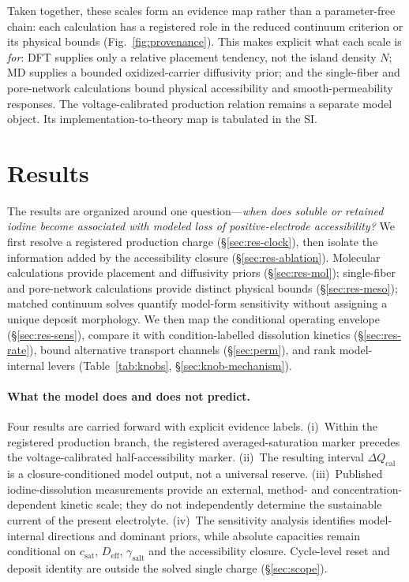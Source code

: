 \documentclass[11pt]{article}
\newcommand{\csat}{c_{\mathrm{sat}}}
\newcommand{\Deff}{D_{\mathrm{eff}}}
\begin{document}
Taken together, these scales form an evidence map rather than a parameter-free chain: each calculation has a
registered role in the reduced continuum criterion or its physical bounds (Fig.~\ref{fig:provenance}). This
makes explicit what each scale is \emph{for}: DFT supplies only a relative placement tendency, not the island
density $N$; MD supplies a bounded oxidized-carrier diffusivity prior; and the single-fiber and pore-network
calculations bound physical accessibility and smooth-permeability responses. The voltage-calibrated
production relation remains a separate model object. Its implementation-to-theory map is tabulated in the SI.

\section{Results}
\label{sec:results}
The results are organized around one question---\emph{when does soluble or retained iodine become associated
with modeled loss of positive-electrode accessibility?} We first resolve a registered production charge
(\S\ref{sec:res-clock}), then isolate the information added by the accessibility closure
(\S\ref{sec:res-ablation}). Molecular calculations provide placement and diffusivity priors
(\S\ref{sec:res-mol}); single-fiber and pore-network calculations provide distinct physical bounds
(\S\ref{sec:res-meso}); matched continuum solves quantify model-form sensitivity without assigning a unique
deposit morphology. We then map the conditional operating envelope (\S\ref{sec:res-sens}), compare it with
condition-labelled dissolution kinetics (\S\ref{sec:res-rate}), bound alternative transport channels
(\S\ref{sec:perm}), and rank model-internal levers (Table~\ref{tab:knobs},
\S\ref{sec:knob-mechanism}).

\paragraph{What the model does and does not predict.}
Four results are carried forward with explicit evidence labels. (i)~Within the registered production branch,
the registered averaged-saturation marker precedes the voltage-calibrated half-accessibility marker. (ii)~The resulting interval
$\Delta Q_{\mathrm{cal}}$ is a closure-conditioned model output, not a universal reserve. (iii)~Published
iodine-dissolution measurements provide an external, method- and concentration-dependent kinetic scale; they
do not independently determine the sustainable current of the present electrolyte. (iv)~The sensitivity
analysis identifies model-internal directions and dominant priors, while absolute capacities remain conditional
on $\csat$, $\Deff$, $\gamma_{\mathrm{salt}}$ and the accessibility closure. Cycle-level reset and deposit
identity are outside the solved single charge (\S\ref{sec:scope}).
\end{document}
